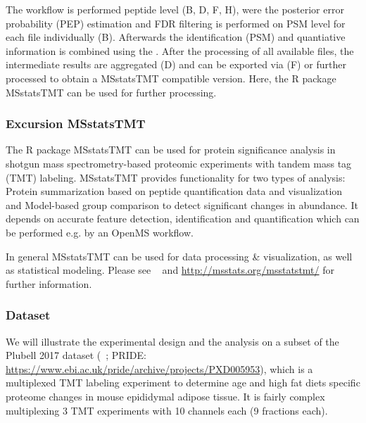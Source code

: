 The workflow is performed peptide level (B, D, F, H), were the posterior error probability (PEP) estimation and FDR filtering is performed on PSM level for each file individually (B). Afterwards the identification (PSM) and quantiative information is combined using the . After the processing of all available files, the intermediate results are aggregated (D) and can be exported via  (F) or further processed to obtain a MSstatsTMT
compatible version. Here, the R package MSstatsTMT can be used for further processing. \\

\subsubsection{Excursion MSstatsTMT}
The R package MSstatsTMT can be used for protein significance analysis in shotgun mass spectrometry-based proteomic experiments with tandem mass tag (TMT) labeling. MSstatsTMT provides functionality for two types of analysis: Protein summarization based on peptide quantification data and visualization and Model-based group comparison to detect significant changes in abundance. It depends on accurate feature detection, identification and quantification which can be performed e.g. by an OpenMS workflow. 

\noindent In general MSstatsTMT can be used for data processing \& visualization, as well as statistical modeling. Please see ~\cite{Huang2020} and \url{http://msstats.org/msstatstmt/} for further information.

\subsubsection{Dataset}
We will illustrate the experimental design and the analysis on a subset of the Plubell 2017 dataset (~\cite{Plubell2017}; PRIDE: \url{https://www.ebi.ac.uk/pride/archive/projects/PXD005953}), which is a multiplexed TMT labeling experiment to determine age and high fat diets specific proteome changes in mouse epididymal adipose tissue. It is fairly complex multiplexing 3 TMT experiments with 10 channels each (9 fractions each). 

